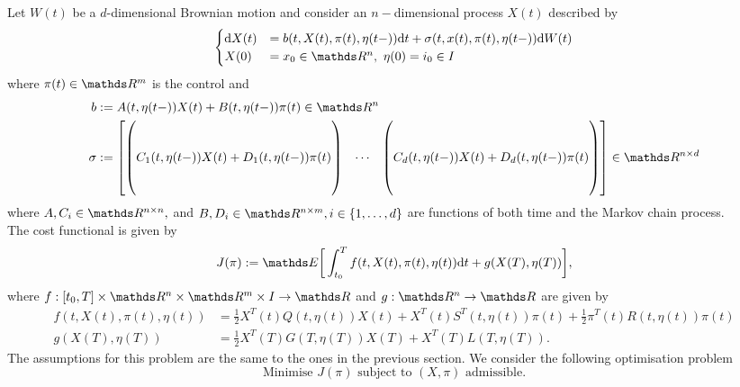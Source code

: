 Let $W(t)$ be a $d$-dimensional Brownian motion and consider an $n-$dimensional process $X(t)$ described by
\begin{equation}
    \begin{cases}
        \d X(t) &= b(t, X(t),\pi(t), \eta(t-)) \d t + \sigma(t, x(t), \pi(t), \eta(t-)) \d W(t)\\
         X(0) &= x_0 \in \R^n, \, \, \eta(0) = i_0 \in I
    \end{cases}
    \label{eq: markov_sde}
\end{equation}
where $\pi(t) \in \R^m$ is the control and
\begin{align*}
    b&:= A(t, \eta(t-)) X(t) + B(t, \eta(t-)) \pi (t) \in \R^{n}\\
    \sigma &:= 
    \begin{bmatrix}
        \begin{pmatrix}
            \\
            \\
            C_1(t, \eta(t-)) X(t) + D_1(t, \eta(t-)) \pi(t)\\
            \\
            \\
        \end{pmatrix} 
        & \cdots & 
        \begin{pmatrix}
            \\
            \\
            C_d(t, \eta(t-)) X(t) + D_d(t, \eta(t-)) \pi(t)\\
            \\
            \\
        \end{pmatrix}
    \end{bmatrix}
    \in \R^{n \times d}
\end{align*}
where $A, C_i \in \R^{n \times n},$ and $B, D_i \in \R^{n \times m}, i \in \{1, \dots, d \}$ are functions of both time and the Markov chain process.\\

The cost functional is given by
\begin{equation}
    J(\pi) := \E \bigg[ \int_{t_0}^T f(t, X(t), \pi(t), \eta(t)) \d t + g(X(T), \eta(T))\bigg], \label{eq: markov_cost_functional}
\end{equation}
where $f: [t_0, T] \times \R^n \times \R^m \times I \to \R$ and $g: \R^n \to \R$ are given by
\begin{align*}
    f(t, X(t), \pi(t), \eta(t)) &= \frac{1}{2} X^T(t) Q(t, \eta(t)) X(t) + X^T(t) S^T(t, \eta(t)) \pi(t) + \frac{1}{2}\pi^T(t) R(t, \eta(t)) \pi(t)\\
    g(X(T), \eta(T)) &= \frac12 X^T(T) G(T, \eta(T)) X(T) + X^T(T) L(T, \eta(T)).
\end{align*}
The assumptions for this problem are the same to the ones in the previous section. We consider the following optimisation problem
\begin{equation}
    \text{Minimise } J(\pi) \text{ subject to } (X, \pi) \text{ admissible}. 
\end{equation}



